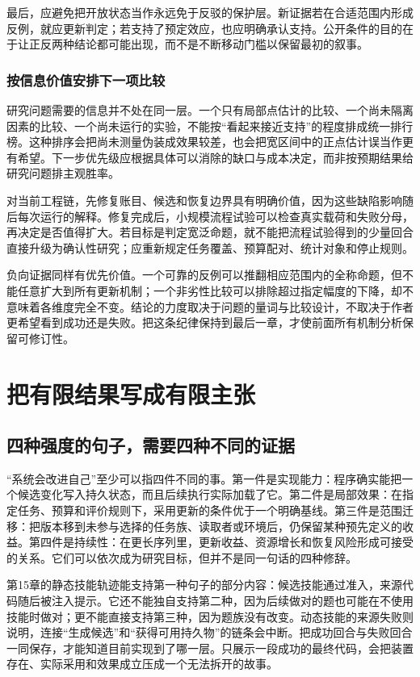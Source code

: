 最后，应避免把开放状态当作永远免于反驳的保护层。新证据若在合适范围内形成反例，就应更新判定；若支持了预定效应，也应明确承认支持。公开条件的目的在于让正反两种结论都可能出现，而不是不断移动门槛以保留最初的叙事。

\subsubsection{按信息价值安排下一项比较}

研究问题需要的信息并不处在同一层。一个只有局部点估计的比较、一个尚未隔离因素的比较、一个尚未运行的实验，不能按“看起来接近支持”的程度排成统一排行榜。这种排序会把尚未测量伪装成效果较差，也会把宽区间中的正点估计误当作更有希望。下一步优先级应根据具体可以消除的缺口与成本决定，而非按预期结果给研究问题排主观胜率。

对当前工程链，先修复账目、候选和恢复边界具有明确价值，因为这些缺陷影响随后每次运行的解释。修复完成后，小规模流程试验可以检查真实载荷和失败分母，再决定是否值得扩大。若目标是判定宽泛命题，就不能把流程试验得到的少量回合直接升级为确认性研究；应重新规定任务覆盖、预算配对、统计对象和停止规则。

负向证据同样有优先价值。一个可靠的反例可以推翻相应范围内的全称命题，但不能任意扩大到所有更新机制；一个非劣性比较可以排除超过指定幅度的下降，却不意味着各维度完全不变。结论的力度取决于问题的量词与比较设计，不取决于作者更希望看到成功还是失败。把这条纪律保持到最后一章，才使前面所有机制分析保留可修订性。


\section{把有限结果写成有限主张}
\label{sec:ch16-finiteclaims}

\subsection{四种强度的句子，需要四种不同的证据}

“系统会改进自己”至少可以指四件不同的事。第一件是实现能力：程序确实能把一个候选变化写入持久状态，而且后续执行实际加载了它。第二件是局部效果：在指定任务、预算和评价规则下，采用更新的条件优于一个明确基线。第三件是范围迁移：把版本移到未参与选择的任务族、读取者或环境后，仍保留某种预先定义的收益。第四件是持续性：在更长序列里，更新收益、资源增长和恢复风险形成可接受的关系。它们可以依次成为研究目标，但并不是同一句话的四种修辞。

第15章的静态技能轨迹能支持第一种句子的部分内容：候选技能通过准入，来源代码随后被注入提示。它还不能独自支持第二种，因为后续做对的题也可能在不使用技能时做对；更不能直接支持第三种，因为题族没有改变。动态技能的来源失败则说明，连接“生成候选”和“获得可用持久物”的链条会中断。把成功回合与失败回合一同保存，才能知道目前实现到了哪一层。只展示一段成功的最终代码，会把装置存在、实际采用和效果成立压成一个无法拆开的故事。

